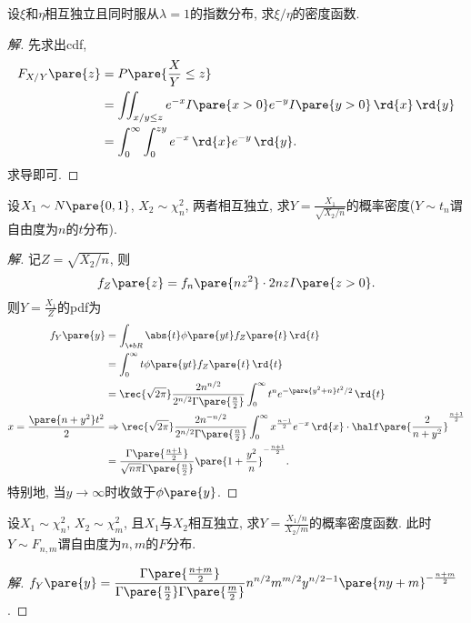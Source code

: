 \documentclass{ctexart}
\begin{document}
\begin{sample}
    \begin{ex}
        设$\xi$和$\eta$相互独立且同时服从$\lambda=1$的指数分布, 求$\xi/\eta$的密度函数.
    \end{ex}
    \begin{proof}[解]
        先求出cdf,
        \begin{align*}
            F_{X/Y}\pare{z} &= P\pare{\frac{X}{Y}\le z} \\
            &= \iint_{x/y\le z} e^{-x}I\pare{x>0} e^{-y} I\pare{y>0}\,\rd{x}\,\rd{y} \\
            &= \int_0^{\infty}\int_0^{zy} e^{-x} \,\rd{x}e^{-y}\,\rd{y}.
        \end{align*}
        求导即可.
    \end{proof}
\end{sample}
\begin{sample}
    \begin{ex}
        设$X_1\sim N\pare{0,1}$, $X_2\sim \chi_n^2$, 两者相互独立, 求$\displaystyle Y = \frac{X_1}{\sqrt{X_2/n}}$的概率密度($Y\sim t_n$谓自由度为$n$的$t$分布).
    \end{ex}
    \begin{proof}[解]
        记$Z = \sqrt{X_2/n}$, 则
        \[ f_Z\pare{z} = f_n\pare{nz^2}\cdot 2nz I\pare{z>0}. \]
        则$Y=\displaystyle \frac{X_1}{Z}$的pdf为
        \begin{align*}
            f_Y\pare{y} &= \int_{\+bR} \abs{t}\phi\pare{yt} f_Z\pare{t}\,\rd{t} \\
            &= \int_0^{\infty} t\phi\pare{yt} f_Z\pare{t}\,\rd{t} \\
            &= \rec{\sqrt{2\pi}} \frac{2n^{n/2}}{2^{n/2}\Gamma\pare{\frac{n}{2}}} \int_0^{\infty} t^n e^{-\pare{y^2+n}t^2/2}\,\rd{t} \\
           x=\frac{\pare{n+y^2}t^2}{2} &\Rightarrow \rec{\sqrt{2\pi}} \frac{2n^{-n/2}}{2^{n/2}\Gamma\pare{\frac{n}{2}}}\int_0^\infty x^{\frac{n-1}{2}}e^{-x}\,\rd{x} \cdot \half \pare{\frac{2}{n+y^2}}^{\frac{n+1}{2}} \\
           &= \frac{\Gamma\pare{\frac{n+1}{2}}}{\sqrt{n\pi}\Gamma\pare{\frac{n}{2}}} \pare{1+\frac{y^2}{n}}^{-\frac{n+1}{2}}.
        \end{align*}
        特别地, 当$y\rightarrow\infty$时收敛于$\phi\pare{y}$.
    \end{proof}
\end{sample}
\begin{sample}
    \begin{ex}
        设$X_1\sim \chi_n^2$, $X_2\sim \chi_m^2$, 且$X_1$与$X_2$相互独立, 求$Y = \displaystyle\frac{X_1/n}{X_2/m}$的概率密度函数. 此时$Y\sim F_{n,m}$谓自由度为$n,m$的$F$分布.
    \end{ex}
    \begin{proof}[解]
        $\displaystyle f_Y\pare{y} = \frac{\Gamma\pare{\frac{n+m}{2}}}{\Gamma\pare{\frac{n}{2}}\Gamma\pare{\frac{m}{2}}}n^{n/2}m^{m/2}y^{n/2-1}\pare{ny+m}^{-\frac{n+m}{2}}$.
    \end{proof}
\end{sample}
\end{document}
